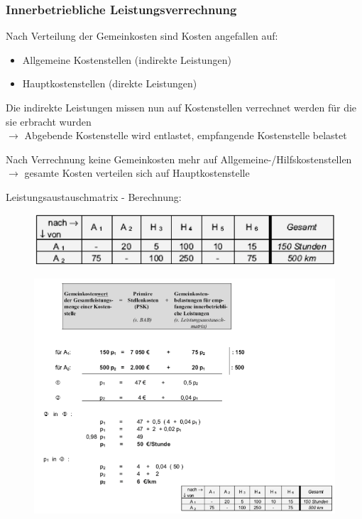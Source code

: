 \documentclass[a4paper,11pt, twoside]{article}
\begin{document}
\subsubsection*{Innerbetriebliche Leistungsverrechnung}
Nach Verteilung der Gemeinkosten sind Kosten angefallen auf:
\begin{itemize}
	\item Allgemeine Kostenstellen (indirekte Leistungen)
	\item Hauptkostenstellen (direkte Leistungen)
\end{itemize}

Die indirekte Leistungen missen nun auf Kostenstellen verrechnet werden für die sie erbracht wurden\\
$\rightarrow$ Abgebende Kostenstelle wird entlastet, empfangende Kostenstelle belastet

Nach Verrechnung keine Gemeinkosten mehr auf Allgemeine-/Hilfskostenstellen\\
$\rightarrow$ gesamte Kosten verteilen sich auf Hauptkostenstelle

Leistungsaustauschmatrix - Berechnung:

\begin{figure}[h]
 \begin{center}
   \includegraphics[scale=0.5]{bilder/leistungsaustauschmatrix.png}
 \end{center}
\end{figure}

\begin{figure}[h]
 \begin{center}
   \includegraphics[scale=0.6]{bilder/leistungsverechnung1.png}
 \end{center}
\end{figure}
\end{document}
